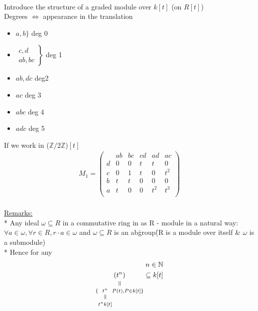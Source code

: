\documentclass[11pt,a4paper]{report}
\newcommand{\verteq}{\rotatebox{90}{$\,=$}}
\newcommand{\equalto}[2]{\underset{\scriptstyle\overset{\mkern4mu\verteq}{#2}}{#1}}
\begin{document}
              \\
              Introduce the structure of a graded module over $k[t]$ (on $R[t]$)\\
              Degrees $\iff$ appearance in the translation\\
              \begin{itemize}
              \item $a,b \}$ deg 0
              \item $\left.\begin{array}{c}c,d\\ab,bc\end{array}\right\}$ deg 1
              \item $ab, dc$ deg2
              \item $ac$ deg 3
              \item $abc$ deg 4
              \item $adc$ deg 5
              \end{itemize}
              If we work in ($\mathbb{Z}/2\mathbb{Z}$)$[t]$\\
              \begin{align*}
                M_1 = \left(\begin{array}{c|ccccc}
                        &ab&bc&cd&ad&ac\\\hline
                        d&0&0&t&t&0\\
                        c&0&1&t&0&t^2\\
                        b&t&t&0&0&0\\
                        a&t&0&0&t^2&t^3\\
                      \end{array}\right)
              \end{align*}
              \\
              \underline{Remarks:}\\
              * Any ideal $\omega \subseteq R$ in a commutative ring in as R - module in a natural way: $\forall a \in \omega, \forall r \in R, r\cdot a \in \omega$ and $\omega \subseteq R$ is an ab\. group\. (R is a module over itself \& $\omega$ is a submodule)\\
              * Hence for any
              \begin{align*}
                n \in \mathbb{N}\\
                \equalto{(t^n)}{\{\equalto{t^n}{t^nk[t]} P(t), P \in k[t]\}} \subseteq k[t]
              \end{align*}
\end{document}
